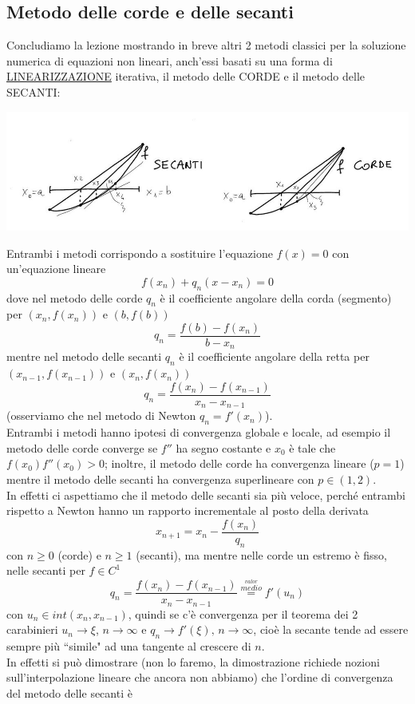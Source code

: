 \documentclass[12pt]{article}
\begin{document}
\subsection{Metodo delle corde e delle secanti}
Concludiamo la lezione mostrando in breve altri 2 metodi classici per la soluzione numerica di equazioni non lineari, anch'essi basati su una forma di \uline{LINEARIZZAZIONE} iterativa, il metodo delle CORDE e il metodo delle SECANTI:
\begin{center}
\includegraphics[width=\textwidth]{pag36.JPG}
\end{center}
Entrambi i metodi corrispondo a sostituire l'equazione $f(x)=0$ con un'equazione lineare
\[ f(x_n)+q_n(x-x_n)=0 \]
dove nel metodo delle corde $q_n$ è il coefficiente angolare della corda (segmento) per $(x_n,f(x_n))$ e $(b,f(b))$
\[ q_n=\frac{f(b)-f(x_n)}{b-x_n} \]
mentre nel metodo delle secanti $q_n$ è il coefficiente angolare della retta per $(x_{n-1},f(x_{n-1}))$ e $(x_n,f(x_n))$
\[ q_n=\frac{f(x_n)-f(x_{n-1})}{x_n-x_{n-1}} \]
(osserviamo che nel metodo di Newton $q_n=f'(x_n)$).\\
Entrambi i metodi hanno ipotesi di convergenza globale e locale, ad esempio il metodo delle corde converge se $f''$ ha segno costante e $x_0$ è tale che $f(x_0)f''(x_0)>0$; inoltre, il metodo delle corde ha convergenza lineare ($p=1$) mentre il metodo delle secanti ha convergenza superlineare con $p\in(1,2)$. \\
In effetti ci aspettiamo che il metodo delle secanti sia più veloce, perché entrambi rispetto a Newton hanno un rapporto incrementale al posto della derivata
\[ x_{n+1}=x_n-\frac{f(x_n)}{q_n} \]
con $n\geq0$ (corde) e $n\geq1$ (secanti), ma mentre nelle corde un estremo è fisso, nelle secanti per $f\in C^1$
\[ q_n=\frac{f(x_n)-f(x_{n-1})}{x_n-x_{n-1}}\overset{\overset{valor}{medio}}{=} f'(u_n) \]
con $u_n\in int(x_n,x_{n-1})$, quindi se c'è convergenza per il teorema dei 2 carabinieri $u_n\rightarrow\xi$, $n\rightarrow\infty$ e $q_n \rightarrow f'(\xi),\, n\rightarrow\infty$, cioè la secante tende ad essere sempre più ``simile" ad una tangente al crescere di $n$.\\In effetti si può dimostrare (non lo faremo, la dimostrazione richiede nozioni sull'interpolazione lineare che ancora non abbiamo) che l'ordine di convergenza del metodo delle secanti è
\end{document}
